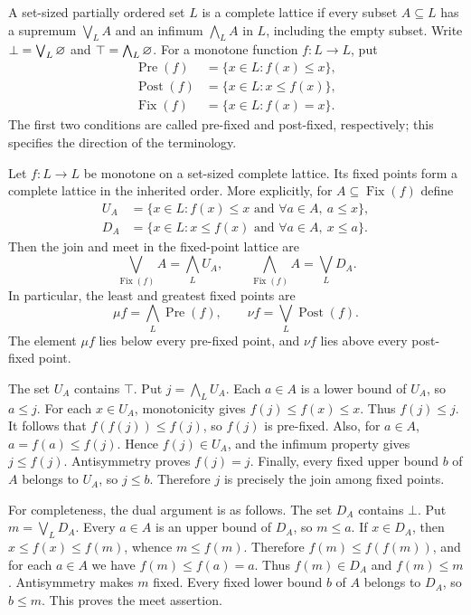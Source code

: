 \begin{definition}
A set-sized partially ordered set $L$ is a complete lattice if every
subset $A\subseteq L$ has a supremum $\bigvee_L A$ and an infimum
$\bigwedge_L A$ in $L$, including the empty subset. Write
$\bot=\bigvee_L\varnothing$ and $\top=\bigwedge_L\varnothing$.
For a monotone function $f:L\to L$, put
\[
\begin{aligned}
\operatorname{Pre}(f)&=\{x\in L:f(x)\leq x\},\\
\operatorname{Post}(f)&=\{x\in L:x\leq f(x)\},\\
\operatorname{Fix}(f)&=\{x\in L:f(x)=x\}.
\end{aligned}
\]
The first two conditions are called pre-fixed and post-fixed,
respectively; this specifies the direction of the terminology.
\end{definition}

\begin{theorem}
Let $f:L\to L$ be monotone on a set-sized complete lattice. Its fixed
points form a complete lattice in the inherited order. More explicitly,
for $A\subseteq\operatorname{Fix}(f)$ define
\[
\begin{aligned}
U_A&=\{x\in L:f(x)\leq x\text{ and }\forall a\in A,\ a\leq x\},\\
D_A&=\{x\in L:x\leq f(x)\text{ and }\forall a\in A,\ x\leq a\}.
\end{aligned}
\]
Then the join and meet in the fixed-point lattice are
\[
\bigvee_{\operatorname{Fix}(f)}A=\bigwedge_L U_A,
\qquad
\bigwedge_{\operatorname{Fix}(f)}A=\bigvee_L D_A.
\]
In particular, the least and greatest fixed points are
\[
\mu f=\bigwedge_L\operatorname{Pre}(f),\qquad
\nu f=\bigvee_L\operatorname{Post}(f).
\]
The element $\mu f$ lies below every pre-fixed point, and $\nu f$
lies above every post-fixed point.
\end{theorem}
\Proof
The set $U_A$ contains $\top$. Put $j=\bigwedge_L U_A$.
Each $a\in A$ is a lower bound of $U_A$, so $a\leq j$.
For each $x\in U_A$, monotonicity gives
$f(j)\leq f(x)\leq x$. Thus $f(j)\leq j$. It follows that
$f(f(j))\leq f(j)$, so $f(j)$ is pre-fixed. Also, for $a\in A$,
$a=f(a)\leq f(j)$. Hence $f(j)\in U_A$, and the infimum property
gives $j\leq f(j)$. Antisymmetry proves $f(j)=j$.
Finally, every fixed upper bound $b$ of $A$ belongs to $U_A$, so
$j\leq b$. Therefore $j$ is precisely the join among fixed points.

For completeness, the dual argument is as follows. The set $D_A$
contains $\bot$. Put $m=\bigvee_L D_A$. Every $a\in A$ is an upper
bound of $D_A$, so $m\leq a$. If $x\in D_A$, then
$x\leq f(x)\leq f(m)$, whence $m\leq f(m)$. Therefore
$f(m)\leq f(f(m))$, and for each $a\in A$ we have
$f(m)\leq f(a)=a$. Thus $f(m)\in D_A$ and $f(m)\leq m$.
Antisymmetry makes $m$ fixed. Every fixed lower bound $b$ of $A$
belongs to $D_A$, so $b\leq m$. This proves the meet assertion.

